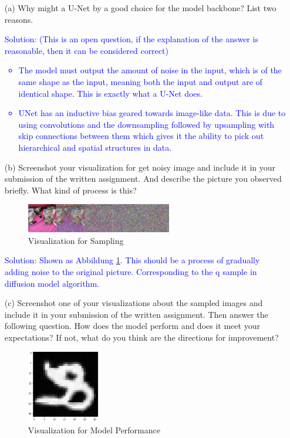 \documentclass[a4paper]{article}
\begin{document}
\begin{itemize}
    \item [(a)]
    Why might a U-Net by a good choice for the model backbone? List two reasons.

    \textcolor{blue}{Solution:
    (This is an open question, if the explanation of the answer is reasonable, then it can be considered correct)
    \begin{itemize}
        \item The model must output the amount of noise in the input, which is of the same shape as the input, meaning both the input and output are of identical shape. This is exactly what a U-Net does.
        \item UNet has an inductive bias geared towards image-like data. This is due to using convolutions and the downsampling followed by upsampling with skip connections between them which gives it the ability to pick out hierarchical and spatial structures in data.
    \end{itemize}
}

    \item [(b)]
    Screenshot your visualization for get noisy image and include it in your submission of the written assignment. And describe the picture you observed briefly. What kind of process is this?

    \begin{figure}[htbp]
        \centering
        \includegraphics[width=0.6\textwidth]{sample.png}
        \caption{Visualization for Sampling}
        \label{fig:sample}
    \end{figure}
    \textcolor{blue}{Solution: Shown as Abbildung \ref{fig:sample}. This should be a process of gradually adding noise to the original picture. Corresponding to the q sample in diffusion model algorithm.
    }

    \item [(c)]
    Screenshot one of your visualizations about the sampled images and include it in your submission of the written assignment. Then answer the following question. How does the model perform and does it meet your expectations? If not, what do you think are the directions for improvement?

    \begin{figure}[htbp]
        \centering
        \includegraphics[width=0.3\textwidth]{performance.png}
        \caption{Visualization for Model Performance}
        \label{fig:perf}
    \end{figure}


\end{itemize}
\end{document}
